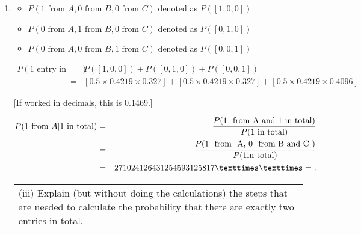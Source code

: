 \documentclass[a4paper,12pt]{article}
\begin{document}
\begin{enumerate}
\begin{table}[ht!]
\begin{tabular}{|p{15cm}|}
\end{tabular}
    
\end{table}


\item 
\begin{framed}
\begin{itemize}
    \item $P(1\mbox{ from }A, 0\mbox{ from }B, 0\mbox{ from }C)$ denoted as  $P([1,0,0])$ 
    \item $P(0\mbox{ from }A, 1\mbox{ from }B, 0\mbox{ from }C)$ denoted as $P([0,1,0])$ 
\item $P(0\mbox{ from }A, 0\mbox{ from }B, 1\mbox{ from }C)$ denoted as $P([0,0,1])$
\end{itemize}
\end{framed}


\begin{eqnarray*}
P(1\mbox{ entry in total}) &=& P([1,0,0]) + P([0,1,0]) + P([0,0,1])\\
&=& \left[ 0.5 \times 0.4219 \times 0.327  \right] + 
\left[ 0.5 \times 0.4219 \times 0.327   \right] + 
\left[ 0.5 \times 0.4219 \times 0.4096   \right] 
\end{eqnarray*}

[If worked in decimals, this is 0.1469.]

\begin{eqnarray*}
P(1 \mbox{ from } A | \mbox{1 in total}) &=& \frac{P(\mbox{1 \mbox{ from A and 1 in total}})}{ P(\mbox{1 in total})}\\
&=& \frac{P(\mbox{1 \mbox{ from } A, 0 \mbox{ from B and C} }) }{P(1 \mbox{in total})} \\
&=& 271024126431254593125817××=.\\
\end{eqnarray*}



\begin{table}[ht!]
     
\centering
     
\begin{tabular}{|p{15cm}|}
     
\hline        

\noindent

(iii) Explain (but without doing the calculations) the steps that are needed to calculate the probability that there are exactly two entries in total.


\end{tabular}
\end{table}
\end{enumerate}
\end{document}
